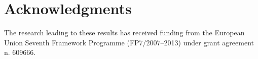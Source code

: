 \section*{Acknowledgments}

The research leading to these results has received funding from the European
Union Seventh Framework Programme (FP7/2007–2013) under grant agreement n.
609666.
